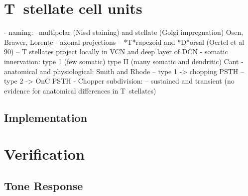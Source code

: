 \documentclass{article}
\begin{document}

\section{T~stellate cell units}











\citep{Oertel:2010}
- naming: 
   --multipolar (Nissl staining) and stellate (Golgi impregnation) Osen, Brawer, Lorente
- axonal projections
   -- *T*rapezoid and *D*orsal  (Oertel et al 90)
   -- T stellates project locally in VCN and deep layer of DCN
- somatic innervation: type 1 (few somatic) type II (many somatic and dendritic) Cant
- anatomical and physiological: Smith and Rhode
   -- type 1 -> chopping PSTH
   -- type 2 -> OnC PSTH
- Chopper subdivision:
   -- sustained and transient (no evidence for anatomical differences in T~stellates)







\subsection{Implementation}


















\section{Verification}
\subsection{Tone Response}

\begin{figure}[htb]
\centering{}
\end{figure}
\begin{figure}[htb]
\centering{}
\end{figure}
\begin{figure}[htb]
\centering{}
\end{figure}
\end{document}
